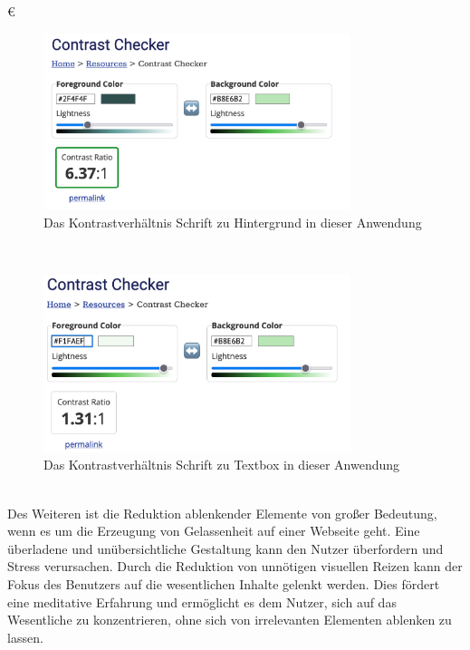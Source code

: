 €\documentclass[./dokumentation.tex]{subfiles}
\begin{document}
\begin{figure}[H]
    \centering
    \includegraphics[width=0.8\textwidth]{bilder/contrast-gelassenheit.png}
    \caption{Das Kontrastverhältnis Schrift zu Hintergrund in dieser Anwendung}
    \label{fig21:contrast}
\end{figure}\\

\begin{figure}[H]
    \centering
    \includegraphics[width=0.8\textwidth]{bilder/contrast-box.png}
    \caption{Das Kontrastverhältnis Schrift zu Textbox in dieser Anwendung}
    \label{fig23:contrast}
\end{figure}\\

Des Weiteren ist die Reduktion ablenkender Elemente von großer Bedeutung, wenn es um die Erzeugung von Gelassenheit auf einer Webseite geht. Eine überladene und unübersichtliche Gestaltung kann den Nutzer überfordern und Stress verursachen. Durch die Reduktion von unnötigen visuellen Reizen kann der Fokus des Benutzers auf die wesentlichen Inhalte gelenkt werden. Dies fördert eine meditative Erfahrung und ermöglicht es dem Nutzer, sich auf das Wesentliche zu konzentrieren, ohne sich von irrelevanten Elementen ablenken zu lassen.\\
\end{document}
